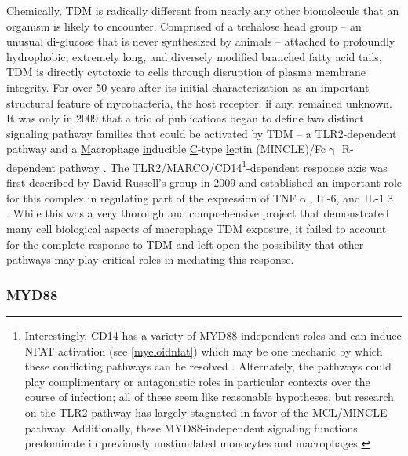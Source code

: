 Chemically, TDM is radically different from nearly any other biomolecule that an organism is likely to encounter. Comprised of a trehalose head group -- an unusual di\hyp{}glucose that is never synthesized by animals \citep{Elbein2003} -- attached to profoundly hydrophobic, extremely long, and diversely modified branched fatty acid tails, TDM is directly cytotoxic to cells through disruption of plasma membrane integrity. For over 50 years after its initial characterization as an important structural feature of mycobacteria, the host receptor, if any, remained unknown. It was only in 2009 that a trio of publications began to define two distinct signaling pathway families that could be activated by TDM -- a TLR2\hyp{}dependent pathway and a \underline{M}acrophage \underline{in}ducible \underline{C}\hyp{}type \underline{le}ctin (MINCLE)/Fc$\upgamma$ R\hyp{}dependent pathway \citep{Werninghaus2009, Ishikawa2009, Bowdish2009}. The TLR2/MARCO/CD14\footnote{Interestingly, CD14 has a variety of MYD88\hyp{}independent roles and can induce NFAT activation (see \autoref{myeloidnfat}) which may be one mechanic by which these conflicting pathways can be resolved \citep{Jiang2005, Nakata2006}. Alternately, the pathways could play complimentary or antagonistic roles in particular contexts over the course of infection; all of these seem like reasonable hypotheses, but research on the TLR2\hyp{}pathway has largely stagnated in favor of the MCL/MINCLE pathway. Additionally, these MYD88\hyp{}independent signaling functions predominate in previously unstimulated monocytes and macrophages \citep{Bjorkbacka2004}}\hyp{}dependent response axis was first described by David Russell's group in 2009 and established an important role for this complex in regulating part of the expression of TNF$\upalpha$, IL\hyp{}6, and IL\hyp{}1$\upbeta$ \citep{Bowdish2009, Manukyan2005}. While this was a very thorough and comprehensive project that demonstrated many cell biological aspects of macrophage TDM exposure, it failed to account for the complete response to TDM and left open the possibility that other pathways may play critical roles in mediating this response. 

\subsubsection{MYD88}

